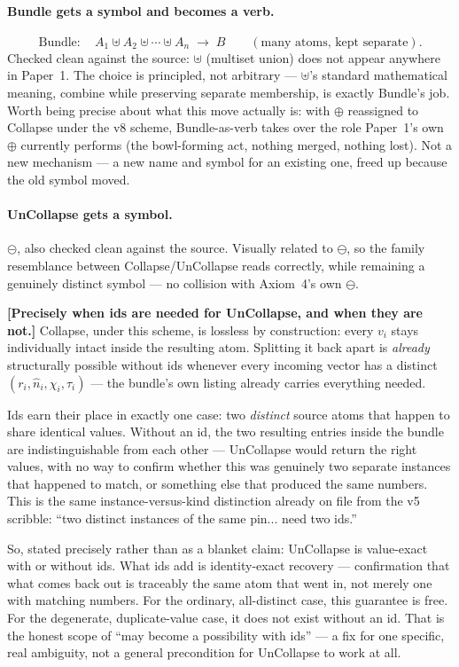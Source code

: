 \documentclass[11pt]{article}
\begin{document}
\paragraph{Bundle gets a symbol and becomes a verb.}
\[
\text{Bundle}:\quad A_1 \uplus A_2 \uplus \cdots \uplus A_n
\;\longrightarrow\; B \qquad (\text{many atoms, kept separate}).
\]
Checked clean against the source: $\uplus$ (multiset union) does not
appear anywhere in Paper~1. The choice is principled, not arbitrary
--- $\uplus$'s standard mathematical meaning, combine while
preserving separate membership, is exactly Bundle's job. Worth being
precise about what this move actually is: with $\oplus$ reassigned to
Collapse under the v8 scheme, Bundle-as-verb takes over the role
Paper~1's own $\oplus$ currently performs (the bowl-forming act,
nothing merged, nothing lost). Not a new mechanism --- a new name and
symbol for an existing one, freed up because the old symbol moved.

\paragraph{UnCollapse gets a symbol.} $\circleddash$, also checked
clean against the source. Visually related to $\ominus$, so the
family resemblance between Collapse/UnCollapse reads correctly, while
remaining a genuinely distinct symbol --- no collision with Axiom~4's
own $\ominus$.

\textbf{[Precisely when ids are needed for UnCollapse, and when they
are not.]} Collapse, under this scheme, is lossless by construction:
every $v_i$ stays individually intact inside the resulting atom.
Splitting it back apart is \emph{already} structurally possible
without ids whenever every incoming vector has a distinct
$(r_i,\hat n_i,\chi_i,\tau_i)$ --- the bundle's own listing already
carries everything needed.

Ids earn their place in exactly one case: two \emph{distinct} source
atoms that happen to share identical values. Without an id, the two
resulting entries inside the bundle are indistinguishable from each
other --- UnCollapse would return the right values, with no way to
confirm whether this was genuinely two separate instances that
happened to match, or something else that produced the same numbers.
This is the same instance-versus-kind distinction already on file
from the v5 scribble: ``two distinct instances of the same pin...
need two ids.''

So, stated precisely rather than as a blanket claim: UnCollapse is
value-exact with or without ids. What ids add is identity-exact
recovery --- confirmation that what comes back out is traceably the
same atom that went in, not merely one with matching numbers. For the
ordinary, all-distinct case, this guarantee is free. For the
degenerate, duplicate-value case, it does not exist without an id.
That is the honest scope of ``may become a possibility with ids'' ---
a fix for one specific, real ambiguity, not a general precondition for
UnCollapse to work at all.
\end{document}
